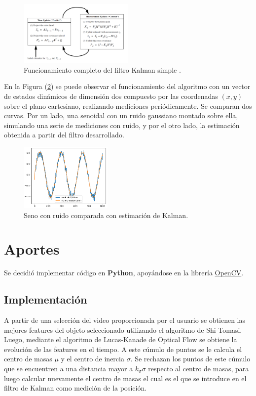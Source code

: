 \begin{figure}[H]
		\centering
		\includegraphics[width=0.5\textwidth]{Imagenes/kalman1.png}
		\caption{Funcionamiento completo del filtro Kalman simple \cite{ref:kalman2}.}
		\label{fig:kalman1}
\end{figure}



 En la Figura (\ref{fig:kalman-comp}) se puede observar el funcionamiento del algoritmo con un vector de estados dinámicos de dimensión dos compuesto por las coordenadas $(x,y)$ sobre el plano cartesiano, realizando mediciones periódicamente. Se comparan dos curvas. Por un lado, una senoidal con un ruido gaussiano montado sobre ella, simulando una serie de mediciones con ruido, y por el otro lado, la estimación obtenida a partir del filtro desarrollado.

\begin{figure}[H]
\centering
	\includegraphics[width=0.4\textwidth]{Imagenes/Kalman_test_1.png}
	\caption{Seno con ruido comparada con estimación de Kalman.}
	\label{fig:kalman-comp}
\end{figure}



\section{Aportes}

Se decidió implementar código en \textbf{Python}, apoyándose en la librería \href{https://opencv.org/}{OpenCV}.

\subsection{Implementación}
A partir de una selección del video proporcionada por el usuario se obtienen las mejores features del objeto seleccionado utilizando el algoritmo de Shi-Tomasi. Luego, mediante el algoritmo de Lucas-Kanade de Optical Flow se obtiene la evolución de las features en el tiempo. A este cúmulo de puntos se le calcula el centro de masas $\mu$ y el centro de inercia $\sigma$. Se rechazan los puntos de este cúmulo que se encuentren a una distancia mayor a $k_{\sigma}\sigma$ respecto al centro de masas, para luego calcular nuevamente el centro de masas el cual es el que se introduce en el filtro de Kalman como medición de la posición.

